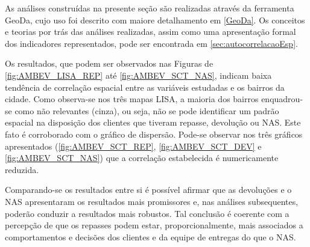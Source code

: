 As análises construídas na presente seção são realizadas através da ferramenta GeoDa, cujo uso foi descrito com maiore detalhamento em \ref{GeoDa}. Os conceitos e teorias por trás das análises realizadas, assim como uma apresentação formal dos indicadores representados, pode ser encontrada em \ref{sec:autocorrelacaoEsp}.

Os resultados, que podem ser observados nas Figuras de \ref{fig:AMBEV_LISA_REP} até %
\ref{fig:AMBEV_SCT_NAS}, indicam baixa tendência de correlação espacial entre as variáveis estudadas e os bairros da cidade. 
Como observa-se nos três mapas LISA, a maioria dos bairros enquadrou-se como não relevantes (cinza), ou seja, não se pode identificar um padrão espacial na disposição dos clientes que tiveram repasse, devolução ou NAS. 
Este fato é corroborado com o gráfico de dispersão. 
Pode-se observar nos três gráficos apresentados (\ref{fig:AMBEV_SCT_REP}, \ref{fig:AMBEV_SCT_DEV} e \ref{fig:AMBEV_SCT_NAS}) que a correlação estabelecida é numericamente reduzida.

Comparando-se os resultados entre si é possível afirmar que as devoluções e o NAS apresentaram os resultados mais promissores e, nas análises subsequentes, poderão conduzir a resultados mais robustos. 
Tal conclusão é coerente com a percepção de que os repasses podem estar, proporcionalmente, mais associados a comportamentos e decisões dos clientes e da equipe de entregas do que o NAS.%

